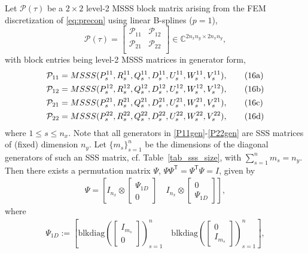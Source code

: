 {\begin{definition}\label{perm_msss}
Let $\mathcal{P}(\tau)$ be a $2 \times 2$ level-2 MSSS block matrix arising from the FEM discretization of \eqref{eq:precon} using linear B-splines ($p=1$),
\begin{equation}
\label{eq:L2Msss}
 \mathcal{P}(\tau) = \begin{bmatrix}
                      \mathcal{P}_{11} & \mathcal{P}_{12}\\
                      \mathcal{P}_{21} & \mathcal{P}_{22}\\
                     \end{bmatrix} \in \mathbb{C}^{2n_xn_y \times 2n_xn_y},
\end{equation}
 with block entries being level-2 MSSS matrices in generator form,
\begin{align}
 \mathcal{P}_{11} &= MSSS(P_s^{11}, R_s^{11}, Q_s^{11}, D_s^{11}, U_s^{11}, W_s^{11}, V_s^{11}), \tag{16a} \label{P11gen}\\
 \mathcal{P}_{12} &= MSSS(P_s^{12}, R_s^{12}, Q_s^{12}, D_s^{12}, U_s^{12}, W_s^{12}, V_s^{12}), \tag{16b} \label{P12gen}\\
 \mathcal{P}_{21} &= MSSS(P_s^{21}, R_s^{21}, Q_s^{21}, D_s^{21}, U_s^{21}, W_s^{21}, V_s^{21}), \tag{16c} \label{P21gen}\\
 \mathcal{P}_{22} &= MSSS(P_s^{22}, R_s^{22}, Q_s^{22}, D_s^{22}, U_s^{22}, W_s^{22}, V_s^{22}), \tag{16d} \label{P22gen} \setcounter{equation}{16}
\end{align}
where $1 \leq s \leq n_x$. Note that all generators in \eqref{P11gen}-\eqref{P22gen} are SSS matrices of (fixed) dimension $n_y$. Let $\{m_s\}_{s=1}^{n}$ be the dimensions of the diagonal generators of such an SSS matrix, cf. \mbox{Table \ref{tab_sss_size}}, with $\sum_{s=1}^n m_s = n_y$. Then there exists a permutation matrix $\Psi$, $\Psi \Psi^\mathsf{T} = \Psi^\mathsf{T} \Psi = I$, given by
\begin{align}
\label{eq:Psi}
\Psi = \left[ I_{n_x} \otimes \begin{bmatrix} \Psi_{1D} \\ 0 \end{bmatrix} \quad I_{n_x} \otimes \begin{bmatrix} 0 \\ \Psi_{1D} \end{bmatrix} \right],
\end{align}
where
\begin{align*}
\Psi_{1D} := \left[ \text{blkdiag}\left( \begin{bmatrix} I_{m_s} \\ 0 \end{bmatrix} \right)_{s=1}^n \quad \text{blkdiag}\left( \begin{bmatrix} 0 \\I_{m_s} \end{bmatrix} \right)_{s=1}^n \right],

\end{align*}
\end{definition}}
